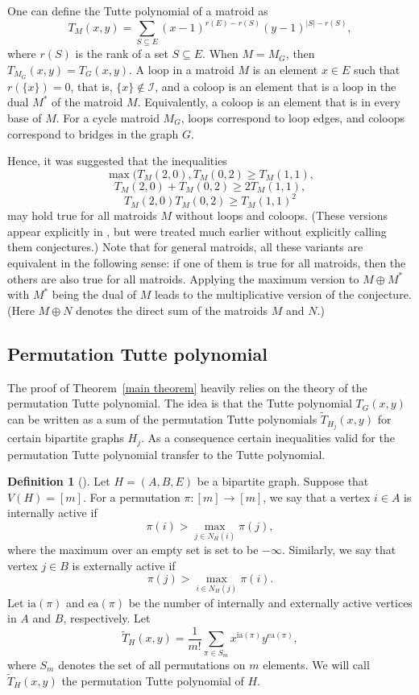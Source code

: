 \documentclass[12pt,a4paper]{amsart}
\numberwithin{equation}{section}
\theoremstyle{plain}
\theoremstyle{definition}
\newtheorem{Def}[Th]{Definition}
\newcommand{\1}{\textbf{1}}
\newcommand{\ia}{\mathrm{ia}}
\newcommand{\ea}{\mathrm{ea}}
\begin{document}
One can define the Tutte polynomial of a matroid 
 as $$T_M(x,y)=\sum_{S\subseteq E}(x-1)^{r(E)-r(S)}(y-1)^{|S|-r(S)},$$
where $r(S)$ is the rank of a set $S\subseteq E$. When $M=M_G$, then $T_{M_G}(x,y)=T_G(x,y)$. A loop in a matroid $M$ is an element $x\in E$ such that $r(\{x\})=0$, that is, $\{x\}\notin \mathcal{I}$, and a coloop is an element that is a loop in the dual $M^*$ of the matroid $M$. Equivalently, a coloop is an element that is in every base of $M$. For a cycle matroid $M_G$, loops correspond to loop edges, and coloops correspond to bridges in the graph $G$. 
\bigskip

Hence, it was suggested that the inequalities  
$$\max(T_M(2,0),T_M(0,2)\geqslant T_M(1,1),$$
$$T_M(2,0)+T_M(0,2)\geqslant 2T_M(1,1),$$
$$T_M(2,0)T_M(0,2)\geqslant T_M(1,1)^2$$
may hold true for all matroids $M$ without loops and coloops. (These versions appear explicitly in \cite{ferroni2023merino}, but were treated much earlier without explicitly calling them conjectures.) 
 Note that for general matroids, all these variants are equivalent in the following sense: if one of them is true for all matroids, then the others are also true for all matroids. Applying the maximum version to $M\oplus M^*$ with $M^*$ being the dual of $M$ leads to the multiplicative version of the conjecture. (Here $M\oplus N$ denotes the direct sum of the matroids $M$ and $N$.)


\subsection{Permutation Tutte polynomial}
The proof of Theorem~\ref{main theorem} heavily relies on the theory of the permutation Tutte polynomial. The idea is that the Tutte polynomial $T_G(x,y)$ can be written as a sum of the permutation Tutte polynomials $\widetilde{T}_{H_j}(x,y)$ for certain bipartite graphs $H_j$. As a consequence certain inequalities valid for the permutation Tutte polynomial transfer to the Tutte polynomial.


\begin{Def}[\cite{beke2024permutation}] \label{main-def}
Let $H=(A,B,E)$ be a bipartite graph. Suppose that $V(H)=[m]$. For a permutation $\pi:[m]\to [m]$, we say that a vertex $i\in A$ is internally active if
$$\pi(i)>\max_{j\in N_H(i)}\pi(j),$$
where the maximum over an empty set is set to be $-\infty$.
Similarly, we say that vertex $j\in B$ is externally active if
$$\pi(j)>\max_{i\in N_H(j)}\pi(i).$$
Let $\ia(\pi)$ and $\ea(\pi)$ be the number of internally and externally active vertices in $A$ and $B$, respectively.
Let
$$\widetilde{T}_H(x,y)=\frac{1}{m!}\sum_{\pi \in S_m}x^{\ia(\pi)}y^{\ea(\pi)},$$
where $S_m$ denotes the set of all permutations on $m$ elements.
We will call $\widetilde{T}_H(x,y)$ the permutation Tutte polynomial of $H$.
\end{Def}
\end{document}
